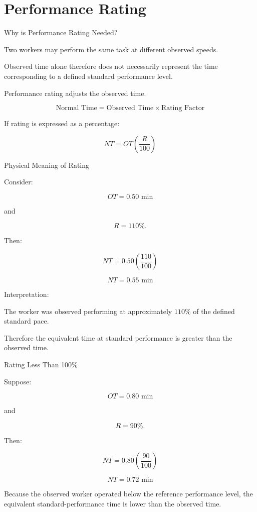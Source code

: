\documentclass[aspectratio=169,10pt]{beamer}
\begin{document}
\section{Performance Rating}

\begin{frame}[shrink=18]{Why is Performance Rating Needed?}
\small

Two workers may perform the same task at different observed speeds.

Observed time alone therefore does not necessarily represent
the time corresponding to a defined standard performance level.

Performance rating adjusts the observed time.

\[
\boxed{
\text{Normal Time}
=
\text{Observed Time}
\times
\text{Rating Factor}
}
\]

If rating is expressed as a percentage:

\[
\boxed{
NT
=
OT\left(\frac{R}{100}\right)
}
\]

\end{frame}


\begin{frame}[shrink=18]{Physical Meaning of Rating}
\small

Consider:

\[
OT=0.50\text{ min}
\]

and

\[
R=110\%.
\]

Then:

\[
NT
=
0.50
\left(
\frac{110}{100}
\right)
\]

\[
\boxed{
NT=0.55\text{ min}
}
\]

Interpretation:

The worker was observed performing at approximately \(110\%\) of
the defined standard pace.

Therefore the equivalent time at standard performance is greater
than the observed time.

\end{frame}


\begin{frame}[shrink=18]{Rating Less Than 100\%}
\small

Suppose:

\[
OT=0.80\text{ min}
\]

and

\[
R=90\%.
\]

Then:

\[
NT
=
0.80
\left(
\frac{90}{100}
\right)
\]

\[
\boxed{
NT=0.72\text{ min}
}
\]

Because the observed worker operated below the reference performance
level, the equivalent standard-performance time is lower than the
observed time.

\end{frame}
\end{document}
